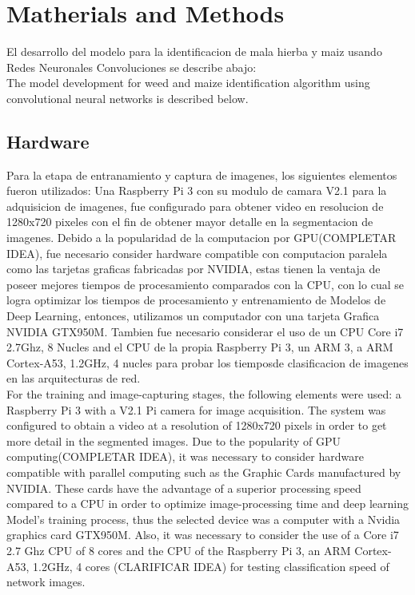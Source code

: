 \documentclass[conference]{IEEEtran}
\begin{document}
\section{Matherials and Methods}

El desarrollo del modelo para la identificacion de mala hierba y maiz usando Redes Neuronales Convoluciones se describe abajo: 
\\

The model development for weed and maize identification algorithm using convolutional neural networks is described below.
\\
\subsection{Hardware}

Para la etapa de entranamiento y captura de imagenes, los siguientes elementos fueron utilizados: Una Raspberry Pi 3 con su modulo de camara V2.1 para la adquisicion de imagenes, fue configurado para obtener video en resolucion de 1280x720 pixeles con el fin de obtener mayor detalle en la segmentacion de imagenes. Debido a la popularidad de la computacion por GPU(COMPLETAR IDEA), fue necesario consider hardware compatible con computacion paralela como las tarjetas graficas fabricadas por NVIDIA, estas tienen la ventaja de poseer mejores tiempos de procesamiento comparados con la CPU, con lo cual se logra optimizar los tiempos de procesamiento y entrenamiento de Modelos de Deep Learning, entonces, utilizamos un computador con una tarjeta Grafica NVIDIA GTX950M. Tambien fue necesario considerar el uso de un CPU Core i7 2.7Ghz, 8 Nucles and el CPU de la propia Raspberry Pi 3, un ARM 3, a ARM Cortex-A53, 1.2GHz, 4 nucles para probar los tiemposde clasificacion de imagenes en las arquitecturas de red.  \\

For the training and image-capturing stages, the following elements were used: a Raspberry Pi 3 with a V2.1 Pi camera for image acquisition. The system was configured to obtain a video at a resolution of 1280x720 pixels in order to get more detail in the segmented images. Due to the popularity of GPU computing(COMPLETAR IDEA), it was necessary to consider hardware compatible with parallel computing such as the Graphic Cards manufactured by NVIDIA. These cards have the advantage of a superior processing speed compared to a CPU in order to optimize image-processing time and deep learning Model's training process, thus the selected device was a computer with a Nvidia graphics card GTX950M. Also, it was necessary to consider the use of a Core i7 2.7 Ghz CPU of 8 cores and the CPU of the Raspberry Pi 3, an ARM Cortex-A53, 1.2GHz, 4 cores (CLARIFICAR IDEA) for testing  classification speed of network images.   
\\
\end{document}
